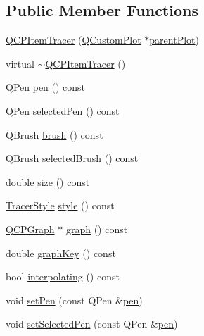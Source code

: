 \subsection*{Public Member Functions}
\begin{DoxyCompactItemize}
\item 
\hyperlink{class_q_c_p_item_tracer_adc5ca846eeac323db4aa1fc4081e36be}{Q\+C\+P\+Item\+Tracer} (\hyperlink{class_q_custom_plot}{Q\+Custom\+Plot} $\ast$\hyperlink{class_q_c_p_layerable_ab7e0e94461566093d36ffc0f5312b109}{parent\+Plot})
\item 
virtual \hyperlink{class_q_c_p_item_tracer_a43686565a9b70815915618636b9bdf0f}{$\sim$\+Q\+C\+P\+Item\+Tracer} ()
\item 
Q\+Pen \hyperlink{class_q_c_p_item_tracer_a1f51b61e98c276298a0874d5e89707f0}{pen} () const 
\item 
Q\+Pen \hyperlink{class_q_c_p_item_tracer_ad75e5d2d868dbedc176f7911091f379b}{selected\+Pen} () const 
\item 
Q\+Brush \hyperlink{class_q_c_p_item_tracer_af07527750cfb6afc3c0ba4bec012011f}{brush} () const 
\item 
Q\+Brush \hyperlink{class_q_c_p_item_tracer_afed284222253083375bfd21d3d4dbc30}{selected\+Brush} () const 
\item 
double \hyperlink{class_q_c_p_item_tracer_a2607fcb3d01e90773ea1532fd6803760}{size} () const 
\item 
\hyperlink{class_q_c_p_item_tracer_a2f05ddb13978036f902ca3ab47076500}{Tracer\+Style} \hyperlink{class_q_c_p_item_tracer_a871832dace1709f877c3136fac7ae1ec}{style} () const 
\item 
\hyperlink{class_q_c_p_graph}{Q\+C\+P\+Graph} $\ast$ \hyperlink{class_q_c_p_item_tracer_a74c90da0e6730839b8d7cf6445a4ec1f}{graph} () const 
\item 
double \hyperlink{class_q_c_p_item_tracer_a361c5c9b93bdf4588fc49bc3097529ad}{graph\+Key} () const 
\item 
bool \hyperlink{class_q_c_p_item_tracer_ab318c233fa35c17a317af38ce7b3c312}{interpolating} () const 
\item 
void \hyperlink{class_q_c_p_item_tracer_af8048636fc1ef0152e51809b008df2ca}{set\+Pen} (const Q\+Pen \&\hyperlink{class_q_c_p_item_tracer_a1f51b61e98c276298a0874d5e89707f0}{pen})
\item 
void \hyperlink{class_q_c_p_item_tracer_ae1bf70db7f13f928660168cd3e5069f3}{set\+Selected\+Pen} (const Q\+Pen \&\hyperlink{class_q_c_p_item_tracer_a1f51b61e98c276298a0874d5e89707f0}{pen})
\item 

\end{DoxyCompactItemize}
